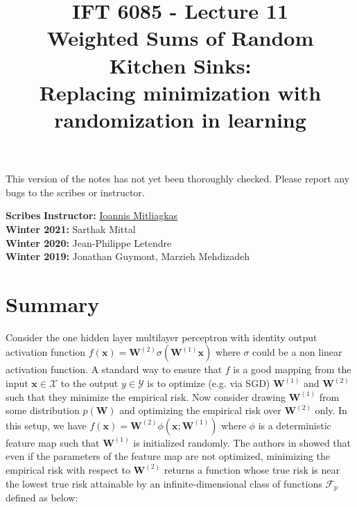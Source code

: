 \documentclass{article}
\title{
    IFT 6085 - Lecture 11 \\
    Weighted Sums of Random Kitchen Sinks:\\ Replacing minimization with randomization in learning
}
\date{}
\begin{document}
    \maketitle


    \vspace{-0.5in}


    \begin{center}
        This version of the notes has not yet been thoroughly checked.
        Please report any bugs to the scribes or instructor.
    \end{center}


    \vspace{0.2in}


    \textbf{Scribes}\hfill
    \textbf{Instructor:}  {\href{https://mitliagkas.github.io/}{Ioannis Mitliagkas}}\\
    \textbf{Winter 2021:} Sarthak Mittal\\
    \textbf{Winter 2020:} Jean-Philippe Letendre\\
    \textbf{Winter 2019:} Jonathan Guymont, Marzieh Mehdizadeh\\


    \newcommand{\infgc}{\inf_{g \in \mathcal{C}}}
    \newcommand{\supgc}{\sup_{g \in \mathcal{C}}}

    \newcommand{\Prob}{\mathbb{P}}
    \newcommand{\E}{\mathbb{E}}
    \newcommand{\reals}{\mathbb{R}}
    \newcommand{\real}{\mathbb{R}}
    \newcommand{\nat}{\mathbb{N}}
    \newcommand{\der}{\mathrm{d}}
    \newcommand{\soft}{\mathrm{softmax}}


    \section{Summary}
    Consider the one hidden layer multilayer perceptron with identity output activation function $f(\mathbf{x})=\mathbf{W}^{(2)}\sigma(\mathbf{W}^{(1)}\mathbf{x})$ where $\sigma$ could be a non linear activation function. A standard way to ensure that $f$ is a good mapping from the input $\mathbf{x}\in \mathcal{X}$ to the output $y\in \mathcal{Y}$ is to optimize (e.g. via SGD) $\mathbf{W}^{(1)}$ and $\mathbf{W}^{(2)}$ such that they minimize the empirical risk. Now consider drawing $\mathbf{W}^{(1)}$ from some distribution $p(\mathbf{W})$ and optimizing the empirical risk over $\mathbf{W}^{(2)}$ only. In this setup, we have $f(\mathbf{x})=\mathbf{W}^{(2)}\phi(\mathbf{x};\mathbf{W}^{(1)})$ where $\phi$ is a deterministic feature map such that $\bm{W}^{(1)}$ is initialized randomly. The authors in \cite{NIPS2008_3495} showed that even if the parameters of the feature map are not optimized, minimizing the empirical risk with respect to $\mathbf{W}^{(2)}$ returns a  function whose true risk is near the lowest true risk attainable by an infinite-dimensional class of functions $\mathcal{F}_p$ defined as below:
\end{document}
